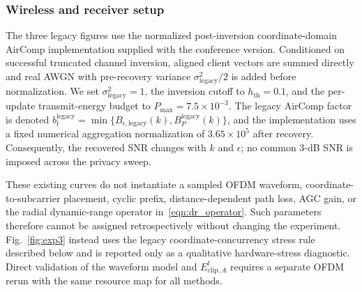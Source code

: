 \documentclass[journal]{IEEEtran}
\newenvironment{revisionblock}{\begingroup\color{revisionred}}{\endgroup}
\begin{document}
\subsubsection{Wireless and receiver setup}
\begin{revisionblock}
The three legacy figures use the normalized post-inversion coordinate-domain AirComp implementation supplied with the conference version. Conditioned on successful truncated channel inversion, aligned client vectors are summed directly and real AWGN with pre-recovery variance $\sigma_{\mathrm{legacy}}^2/2$ is added before normalization. We set $\sigma_{\mathrm{legacy}}^2=1$, the inversion cutoff to $h_{\mathrm{th}}=0.1$, and the per-update transmit-energy budget to $P_{\max}=7.5\times10^{-3}$. The legacy AirComp factor is denoted $b_t^{\mathrm{legacy}}=\min\{B_{\epsilon,\mathrm{legacy}}(k),B_P^{\mathrm{legacy}}(k)\}$, and the implementation uses a fixed numerical aggregation normalization of $3.65\times10^5$ after recovery. Consequently, the recovered SNR changes with $k$ and $\epsilon$; no common 3-dB SNR is imposed across the privacy sweep.

These existing curves do not instantiate a sampled OFDM waveform, coordinate-to-subcarrier placement, cyclic prefix, distance-dependent path loss, AGC gain, or the radial dynamic-range operator in~\eqref{eqn:dr_operator}. Such parameters therefore cannot be assigned retrospectively without changing the experiment. Fig.~\ref{fig:exp3} instead uses the legacy coordinate-concurrency stress rule described below and is reported only as a qualitative hardware-stress diagnostic. Direct validation of the waveform model and $E_{\mathrm{clip},A}^t$ requires a separate OFDM rerun with the same resource map for all methods.
\end{revisionblock}
\end{document}
